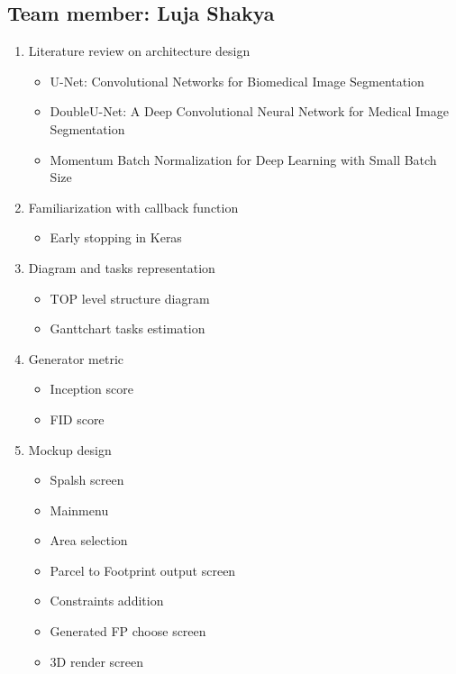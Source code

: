 \subsection{Team member: Luja Shakya}
\begin{enumerate}[label=\alph*.]
    \item Literature review on architecture design
          \begin{itemize}
              \item U-Net: Convolutional Networks for Biomedical Image Segmentation
              \item DoubleU-Net: A Deep Convolutional Neural Network for Medical Image Segmentation
              \item Momentum Batch Normalization for Deep Learning with Small Batch Size
          \end{itemize}

    \item{Familiarization with callback function}
          \begin{itemize}
              \item Early stopping in Keras
          \end{itemize}
    \item{Diagram and tasks representation}
          \begin{itemize}
            \item TOP level structure diagram
            \item Ganttchart tasks estimation
          \end{itemize}
    \item{Generator metric}
          \begin{itemize}
            \item Inception score
            \item FID score
          \end{itemize}     
    \item{Mockup design}
          \begin{itemize}
          \item Spalsh screen
          \item Mainmenu
          \item Area selection
          \item Parcel to Footprint output screen
          \item Constraints addition
          \item Generated FP choose screen
          \item 3D render screen
          \end{itemize}
\end{enumerate}
